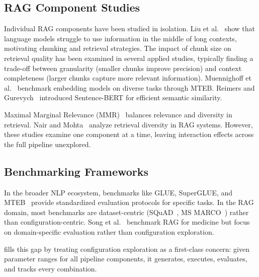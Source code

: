 \subsection{RAG Component Studies}

Individual RAG components have been studied in isolation. Liu et al.~\cite{liu2024lost} show that language models struggle to use information in the middle of long contexts, motivating chunking and retrieval strategies. The impact of chunk size on retrieval quality has been examined in several applied studies, typically finding a trade-off between granularity (smaller chunks improve precision) and context completeness (larger chunks capture more relevant information). Muennighoff et al.~\cite{muennighoff2022mteb} benchmark embedding models on diverse tasks through MTEB. Reimers and Gurevych~\cite{reimers2019sentence} introduced Sentence-BERT for efficient semantic similarity.

Maximal Marginal Relevance (MMR)~\cite{spanakis2018similarity} balances relevance and diversity in retrieval. Nair and Mohta~\cite{izrailovsky2024rag} analyze retrieval diversity in RAG systems. However, these studies examine one component at a time, leaving interaction effects across the full pipeline unexplored.

\subsection{Benchmarking Frameworks}

In the broader NLP ecosystem, benchmarks like GLUE, SuperGLUE, and MTEB~\cite{muennighoff2022mteb} provide standardized evaluation protocols for specific tasks. In the RAG domain, most benchmarks are dataset-centric (SQuAD~\cite{rajpurkar2016squad}, MS MARCO~\cite{wu2024msmarco}) rather than configuration-centric. Song et al.~\cite{song2024bench} benchmark RAG for medicine but focus on domain-specific evaluation rather than configuration exploration.

\toolname{} fills this gap by treating configuration exploration as a first-class concern: given parameter ranges for all pipeline components, it generates, executes, evaluates, and tracks every combination.
